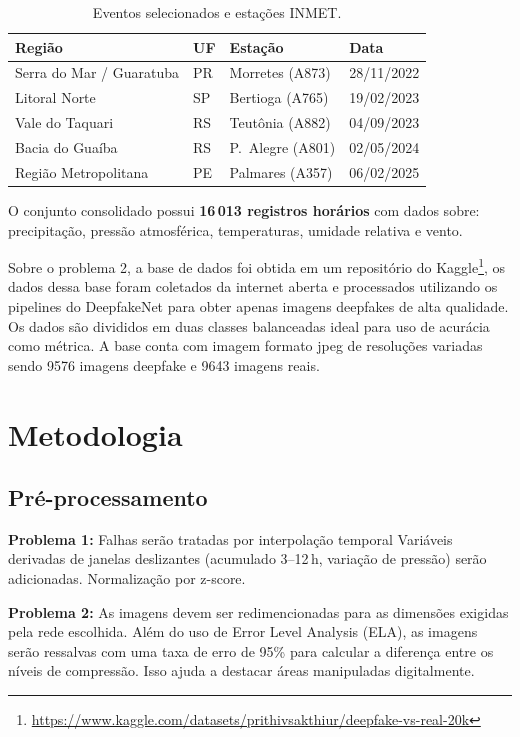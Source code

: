 \documentclass[10pt,twocolumn,letterpaper]{article}
\begin{document}
\begin{table}[h]
\centering
\caption{Eventos selecionados e estações INMET.}
\label{tab:eventos}
\small
\setlength{\tabcolsep}{3pt}
\begin{tabular}{@{}llll@{}}
\toprule
\textbf{Região} & \textbf{UF} & \textbf{Estação} & \textbf{Data} \\
\midrule
Serra do Mar / Guaratuba  & PR & Morretes (A873)   & 28/11/2022 \\
Litoral Norte             & SP & Bertioga (A765)   & 19/02/2023 \\
Vale do Taquari           & RS & Teutônia (A882)   & 04/09/2023 \\
Bacia do Guaíba           & RS & P.\ Alegre (A801) & 02/05/2024 \\
Região Metropolitana      & PE & Palmares (A357)   & 06/02/2025 \\
\bottomrule
\end{tabular}
\end{table}

O conjunto consolidado possui \textbf{16\,013 registros horários} com dados sobre: precipitação, pressão atmosférica, temperaturas, umidade relativa e vento.

Sobre o problema 2, a base de dados foi obtida em um repositório do Kaggle\footnote{\url{https://www.kaggle.com/datasets/prithivsakthiur/deepfake-vs-real-20k}}, os dados dessa base foram coletados da internet aberta e processados utilizando os pipelines do DeepfakeNet para obter apenas imagens deepfakes de alta qualidade. Os dados são divididos em duas classes balanceadas ideal para uso de acurácia como métrica\cite{Rafique2023}. A base conta com imagem formato jpeg de resoluções variadas sendo 9576 imagens deepfake e 9643 imagens reais.
\section{Metodologia}

\subsection{Pré-processamento}
\textbf{Problema 1:} Falhas serão tratadas por interpolação temporal Variáveis derivadas de janelas deslizantes (acumulado 3--12\,h, variação de
pressão) serão adicionadas. Normalização por z-score.

\textbf{Problema 2:} As imagens devem ser redimencionadas para as dimensões exigidas pela rede escolhida. Além do uso de Error Level Analysis (ELA), as imagens serão ressalvas com uma taxa de erro de 95\% para calcular a diferença entre os níveis de compressão. Isso ajuda a destacar áreas manipuladas digitalmente\cite{Rafique2023}.
\end{document}
